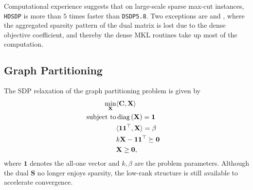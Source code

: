 Computational experience suggests that on large-scale sparse max-cut instances, {{\texttt{HDSDP}}} 
is more than $5$ times faster than {{\texttt{DSDP5.8}}}. Two exceptions are  and , where the aggregated sparsity pattern of the dual matrix is lost due to the dense objective coefficient, and thereby the dense MKL routines take up most of the computation.

\subsection{Graph Partitioning}

The SDP relaxation of the graph partitioning problem is given by
\begin{eqnarray*}
  \min_{\mathbf{X}} & \langle \mathbf{C}, \mathbf{X} \rangle & \\
  \text{subject to} & \ensuremath{\operatorname{diag}} \left( \mathbf{X} \right) = \textbf{1} & \\
  & \langle \textbf{{\textbf{1}}1}^{\top}, \mathbf{X} \rangle = \beta &
  \\
  & k \mathbf{X} - \textbf{{\textbf{1}}1}^{\top} \succeq \textbf{0} & \\
  & \mathbf{X} \geq \textbf{0}, & 
\end{eqnarray*}
where $\textbf{1}$ denotes the all-one vector and $k, \beta$ are the problem
parameters. Although the dual $\mathbf{S}$ no longer enjoys sparsity, the low-rank
structure is still available to accelerate convergence.

